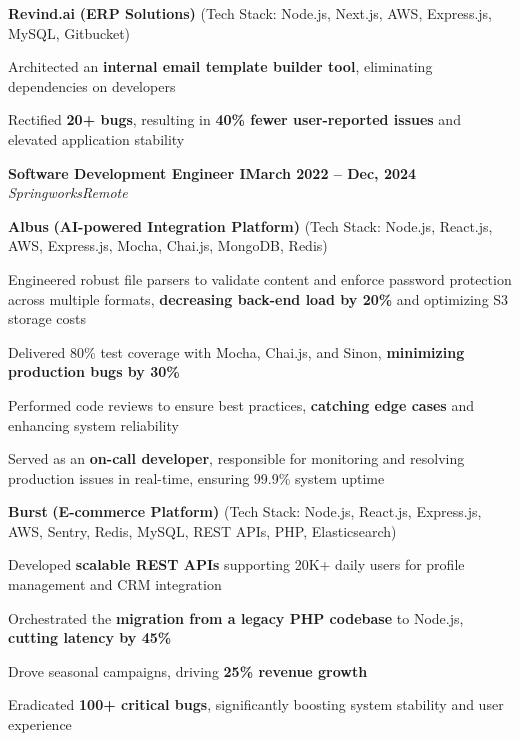 \documentclass[letterpaper, 10pt]{article}
\newcommand{\heading}[2]{ \hspace{5pt}#1\hfill#2\\[1pt] }
\newcommand{\headingBf}[2]{ \heading{\textbf{#1}}{\textbf{#2}} }
\newcommand{\headingIt}[2]{ \heading{\textit{#1}}{\textit{#2}} }
\newenvironment{resume_list}{
\vspace{-3pt}
\begin{itemize}[itemsep=0.5pt, parsep=0.5pt, leftmargin=18pt] }{ \end{itemize}
\vspace{-3pt}
}
\begin{document}
\vspace{2pt}

\hspace{10pt}\textbf{Revind.ai} \textbf{(ERP Solutions)} \small{(Tech Stack: Node.js, Next.js, AWS, Express.js, MySQL, Gitbucket)}
\begin{resume_list}
    \item Architected an \textbf{internal email template builder tool}, eliminating dependencies on developers
    \item Rectified \textbf{20+ bugs}, resulting in \textbf{40\% fewer user-reported issues} and elevated application stability
\end{resume_list}

\vspace{6pt}

\headingBf{Software Development Engineer I}{March 2022 -- Dec, 2024}
\headingIt{Springworks}{Remote}

\vspace{2pt}

\hspace{10pt}\textbf{Albus} \textbf{(AI-powered Integration Platform)} \small{(Tech Stack: Node.js, React.js, AWS, Express.js, Mocha, Chai.js, MongoDB, Redis)}
\begin{resume_list}
    \item Engineered robust file parsers to validate content and enforce password protection across multiple formats, \textbf{decreasing back-end load by 20\%} and optimizing S3 storage costs 
    \item Delivered 80\% test coverage with Mocha, Chai.js, and Sinon, \textbf{minimizing production bugs by 30\%}
    \item Performed code reviews to ensure best practices, \textbf{catching edge cases} and enhancing system reliability
    \item Served as an \textbf{on-call developer}, responsible for monitoring and resolving production issues in real-time, ensuring 99.9\% system uptime
\end{resume_list}

\vspace{4pt}

\hspace{10pt}\textbf{Burst} \textbf{(E-commerce Platform)} \small{(Tech Stack: Node.js, React.js, Express.js, AWS, Sentry, Redis, MySQL, REST APIs, PHP, Elasticsearch)}
\begin{resume_list}
    \item Developed \textbf{scalable REST APIs} supporting 20K+ daily users for profile management and CRM integration
    \item Orchestrated the \textbf{migration from a legacy PHP codebase} to Node.js, \textbf{cutting latency by 45\%}
    \item Drove seasonal campaigns, driving \textbf{25\% revenue growth}
    \item Eradicated \textbf{100+ critical bugs}, significantly boosting system stability and user experience
\end{resume_list}
\end{document}
